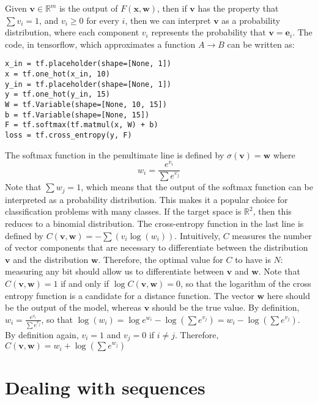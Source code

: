 \documentclass[10pt]{amsart}
\newcommand{\R}{\mathbb{R}}
\renewcommand{\v}{\mathbf{v}}
\newcommand{\w}{\mathbf{w}}
\newcommand{\x}{\mathbf{x}}
\newcommand{\e}{\mathbf{e}}
\theoremstyle{definition}
\begin{document}
Given $\v\in\R^m$ is the output of $F(\x,\w)$, then if $\v$ has the property that $\sum v_i=1$, and $v_i\geq 0$ for every $i$, then we can interpret $\v$ as a probability distribution, where each component $v_i$ represents the probability that $\v=\e_i$.  The code, in tensorflow, which approximates a function $A\to B$ can be written as:

\begin{verbatim}
x_in = tf.placeholder(shape=[None, 1])
x = tf.one_hot(x_in, 10)
y_in = tf.placeholder(shape=[None, 1])
y = tf.one_hot(y_in, 15)
W = tf.Variable(shape=[None, 10, 15])
b = tf.Variable(shape=[None, 15])
F = tf.softmax(tf.matmul(x, W) + b)
loss = tf.cross_entropy(y, F)
\end{verbatim}

The softmax function in the penultimate line is defined by $\sigma(\v) = \w$  where $$w_i= \frac{e^{v_i}}{\sum e^{v_j}}$$ Note that $\sum w_j=1$, which means that the output of the softmax function can be interpreted as a probability distribution.  This makes it a popular choice for classification problems with many classes.  If the target space is $\R^2$, then this reduces to a binomial distribution.  The cross-entropy function in the last line is defined by $C(\v, \w) = -\sum(v_i\log(w_i))$.  Intuitively, $C$ measures the number of vector components that are necessary to differentiate between the distribution $\v$ and the distribution $\w$.  Therefore, the optimal value for $C$ to have is $N$: measuring any bit should allow us to differentiate between $\v$ and $\w$.  Note that $C(\v, \w)=1$ if and only if $\log C(\v, \w)=0$, so that the logarithm of the cross entropy function is a candidate for a distance function. The vector $\w$ here should be the output of the model, whereas $\v$ should be the true value.  By definition, $w_i= \frac{e^{v_i}}{\sum e^{v_j}}$, so that $\log(w_i) = \log e^{w_i} - \log(\sum e^{v_j}) = w_i - \log(\sum e^{v_j})$. By definition again, $v_i=1$ and $v_j=0$ if $i\not=j$. Therefore, $C(\v, \w) = w_i + \log(\sum e^{w_j})$


\section{Dealing with sequences}
\end{document}
